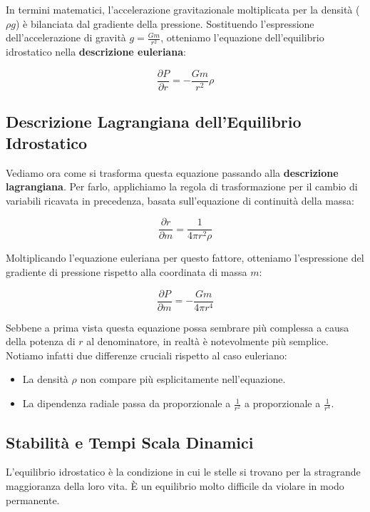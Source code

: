 In termini matematici, l'accelerazione gravitazionale moltiplicata per la densità ($\rho g$) è bilanciata dal gradiente della pressione. Sostituendo l'espressione dell'accelerazione di gravità $g = \frac{Gm}{r^2}$, otteniamo l'equazione dell'equilibrio idrostatico nella \textbf{descrizione euleriana}:

\begin{equation}
\frac{\partial P}{\partial r} = -\frac{G m}{r^2} \rho
\end{equation}

\subsection{Descrizione Lagrangiana dell'Equilibrio Idrostatico}

Vediamo ora come si trasforma questa equazione passando alla \textbf{descrizione lagrangiana}. Per farlo, applichiamo la regola di trasformazione per il cambio di variabili ricavata in precedenza, basata sull'equazione di continuità della massa:

\begin{equation}
\frac{\partial r}{\partial m} = \frac{1}{4\pi r^2 \rho}
\end{equation}

Moltiplicando l'equazione euleriana per questo fattore, otteniamo l'espressione del gradiente di pressione rispetto alla coordinata di massa $m$:

\begin{equation}
\frac{\partial P}{\partial m} = -\frac{G m}{4\pi r^4}
\end{equation}

Sebbene a prima vista questa equazione possa sembrare più complessa a causa della potenza di $r$ al denominatore, in realtà è notevolmente più semplice. Notiamo infatti due differenze cruciali rispetto al caso euleriano:
\begin{itemize}
\item La densità $\rho$ non compare più esplicitamente nell'equazione.
\item La dipendenza radiale passa da proporzionale a $\frac{1}{r^2}$ a proporzionale a $\frac{1}{r^4}$.
\end{itemize}

\subsection{Stabilità e Tempi Scala Dinamici}

L'equilibrio idrostatico è la condizione in cui le stelle si trovano per la stragrande maggioranza della loro vita. È un equilibrio molto difficile da violare in modo permanente.

